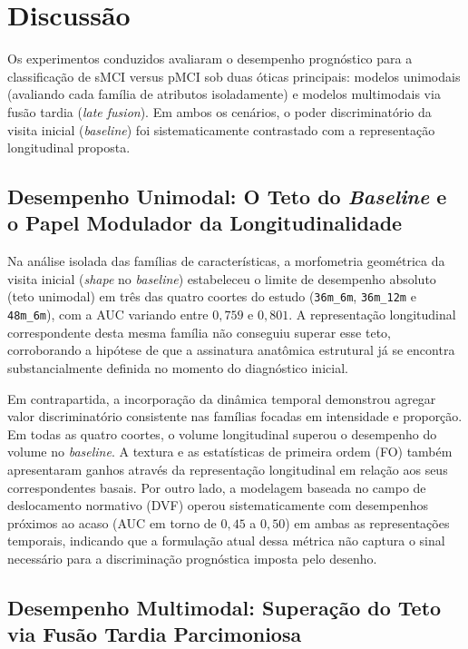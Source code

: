 \documentclass[review]{elsarticle}
\newcommand{\code}[1]{\texttt{#1}}
\begin{document}
\section{Discussão}\label{sec:Discussions}

Os experimentos conduzidos avaliaram o desempenho prognóstico para a classificação de sMCI versus pMCI sob duas óticas principais: modelos unimodais (avaliando cada família de atributos isoladamente) e modelos multimodais via fusão tardia (\emph{late fusion}). Em ambos os cenários, o poder discriminatório da visita inicial (\textit{baseline}) foi sistematicamente contrastado com a representação longitudinal proposta.

\subsection*{Desempenho Unimodal: O Teto do \textit{Baseline} e o Papel Modulador da Longitudinalidade}

Na análise isolada das famílias de características, a morfometria geométrica da visita inicial (\emph{shape} no \textit{baseline}) estabeleceu o limite de desempenho absoluto (teto unimodal) em três das quatro coortes do estudo (\code{36m\_6m}, \code{36m\_12m} e \code{48m\_6m}), com a AUC variando entre $0,759$ e $0,801$. A representação longitudinal correspondente desta mesma família não conseguiu superar esse teto, corroborando a hipótese de que a assinatura anatômica estrutural já se encontra substancialmente definida no momento do diagnóstico inicial.

Em contrapartida, a incorporação da dinâmica temporal demonstrou agregar valor discriminatório consistente nas famílias focadas em intensidade e proporção. Em todas as quatro coortes, o volume longitudinal superou o desempenho do volume no \textit{baseline}. A textura e as estatísticas de primeira ordem (FO) também apresentaram ganhos através da representação longitudinal em relação aos seus correspondentes basais. Por outro lado, a modelagem baseada no campo de deslocamento normativo (DVF) operou sistematicamente com desempenhos próximos ao acaso (AUC em torno de $0,45$ a $0,50$) em ambas as representações temporais, indicando que a formulação atual dessa métrica não captura o sinal necessário para a discriminação prognóstica imposta pelo desenho.

\subsection*{Desempenho Multimodal: Superação do Teto via Fusão Tardia Parcimoniosa}
\end{document}
